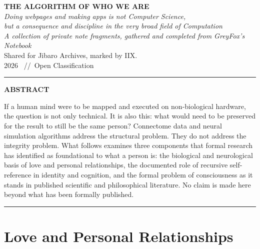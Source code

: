 \documentclass[11pt,a4paper]{article}
\begin{document}
\begin{center}
{\LARGE\bfseries THE ALGORITHM OF WHO WE ARE}\\[1.0em]
{\itshape\large Doing webpages and making apps is not Computer Science,\\
but a consequence and discipline in the very broad field of Computation}\\[1.2em]
{\itshape A collection of private note fragments, gathered and completed from GreyFox's Notebook}\\[0.3em]
Shared for Jibaro Archives, marked by IIX.\\[0.2em]
{\small\color{gray!60!black} 2026 \ //\ Open Classification}
\end{center}

\vspace{0.5em}
\noindent\rule{\textwidth}{1.2pt}
\vspace{0.4em}

\begin{center}
\textbf{\large ABSTRACT}
\end{center}

If a human mind were to be mapped and executed on non-biological hardware, the question is not only technical. It is also this: what would need to be preserved for the result to still be the same person? Connectome data and neural simulation algorithms address the structural problem. They do not address the integrity problem. What follows examines three components that formal research has identified as foundational to what a person is: the biological and neurological basis of love and personal relationships, the documented role of recursive self-reference in identity and cognition, and the formal problem of consciousness as it stands in published scientific and philosophical literature. No claim is made here beyond what has been formally published.

\vspace{0.4em}
\noindent\rule{\textwidth}{0.4pt}

\section{Love and Personal Relationships}
\end{document}
